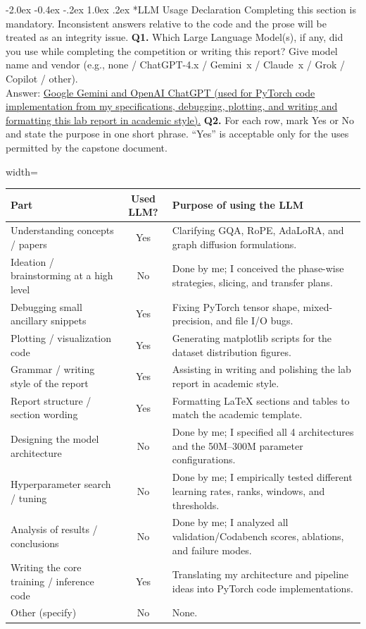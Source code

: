 \documentclass[11pt, oneside]{article}
\makeatletter
\renewcommand\section{\@startsection {section}{1}{\z@}%
  {-2.0ex \@plus -0.4ex \@minus -.2ex}%
  {1.0ex \@plus.2ex}%
  {\normalfont\Large\bfseries}}
\makeatother
\begin{document}
\newpage
\section*{LLM Usage Declaration}
Completing this section is mandatory. Inconsistent answers relative to the code and the prose will be treated as an integrity issue.
\medskip
\noindent
\textbf{Q1.} Which Large Language Model(s), if any, did you use while completing the competition or writing this report? Give model name and vendor (e.g., none / ChatGPT-4.x / Gemini~x / Claude~x / Grok / Copilot / other). \\[0.4em]
Answer: \underline{Google Gemini and OpenAI ChatGPT (used for PyTorch code implementation from my specifications, debugging, plotting, and writing and formatting this lab report in academic style).}
\medskip
\noindent
\textbf{Q2.} For each row, mark Yes or No and state the purpose in one short phrase. ``Yes'' is acceptable only for the uses permitted by the capstone document.
\begin{table}[H]
\centering
\small
\begin{adjustbox}{width=\textwidth}
\begin{tabular}{@{}p{4.6cm}|c|p{7.6cm}@{}}
\toprule
Part & Used LLM? & Purpose of using the LLM \\
\midrule
Understanding concepts / papers & Yes & Clarifying GQA, RoPE, AdaLoRA, and graph diffusion formulations. \\
Ideation / brainstorming at a high level & No & Done by me; I conceived the phase-wise strategies, slicing, and transfer plans. \\
Debugging small ancillary snippets & Yes & Fixing PyTorch tensor shape, mixed-precision, and file I/O bugs. \\
Plotting / visualization code & Yes & Generating matplotlib scripts for the dataset distribution figures. \\
Grammar / writing style of the report & Yes & Assisting in writing and polishing the lab report in academic style. \\
Report structure / section wording & Yes & Formatting LaTeX sections and tables to match the academic template. \\
Designing the model architecture & No & Done by me; I specified all 4 architectures and the 50M--300M parameter configurations. \\
Hyperparameter search / tuning & No & Done by me; I empirically tested different learning rates, ranks, windows, and thresholds. \\
Analysis of results / conclusions & No & Done by me; I analyzed all validation/Codabench scores, ablations, and failure modes. \\
Writing the core training / inference code & Yes & Translating my architecture and pipeline ideas into PyTorch code implementations. \\
Other (specify) & No & None. \\
\bottomrule
\end{tabular}
\end{adjustbox}
\end{table}
\end{document}
